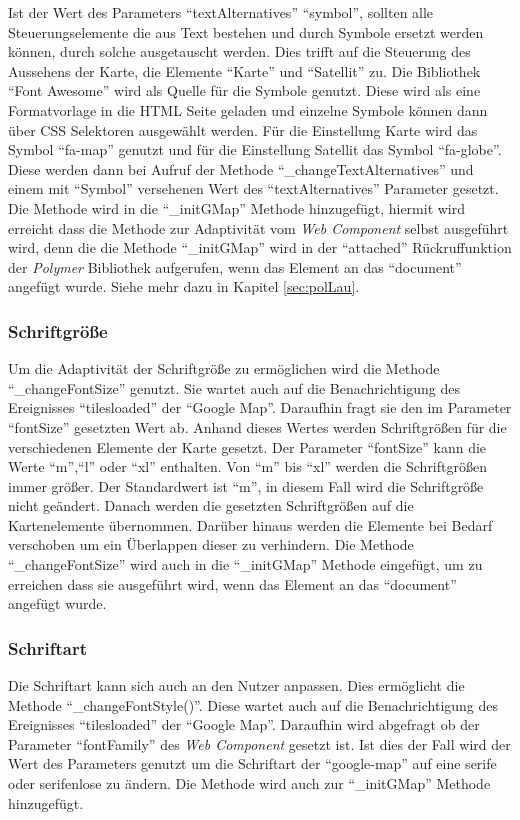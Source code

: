 \documentclass[12pt, paper=a4, bibtotoc, toc=listof, headsepline=true]{scrreprt}
\begin{document}
		\newline
		Ist der Wert des Parameters \enquote{textAlternatives} \enquote{symbol}, sollten alle Steuerungselemente die aus Text bestehen und durch Symbole ersetzt werden können, durch solche ausgetauscht werden. Dies trifft auf die Steuerung des Aussehens der Karte, die Elemente \enquote{Karte} und \enquote{Satellit} zu. Die Bibliothek \enquote{Font Awesome} wird als Quelle für die Symbole genutzt. Diese wird als eine Formatvorlage in die \ac{HTML} Seite geladen und einzelne Symbole können dann über \ac{CSS} Selektoren ausgewählt werden. Für die Einstellung Karte wird das Symbol \enquote{fa-map} genutzt und für die Einstellung Satellit das Symbol \enquote{fa-globe}. Diese werden dann bei Aufruf der Methode \enquote{\_changeTextAlternatives} und einem mit \enquote{Symbol} versehenen Wert des \enquote{textAlternatives} Parameter gesetzt. Die Methode wird in die \enquote{\_initGMap} Methode hinzugefügt, hiermit wird erreicht dass die Methode zur Adaptivität vom \emph{Web Component} selbst ausgeführt wird, denn die die Methode \enquote{\_initGMap} wird in der \enquote{attached} Rückruffunktion der \emph{Polymer} Bibliothek aufgerufen, wenn das Element an das \enquote{document} angefügt wurde. Siehe mehr dazu in Kapitel \ref{sec:polLau}.
		\subsubsection{Schriftgröße}
		\label{sec:fontsize}
		Um die Adaptivität der Schriftgröße zu ermöglichen wird die Methode \enquote{\_changeFontSize} genutzt.  Sie wartet auch auf die Benachrichtigung des Ereignisses \enquote{tilesloaded} der \enquote{Google Map}. Daraufhin fragt sie den im Parameter \enquote{fontSize} gesetzten Wert ab. Anhand dieses Wertes werden Schriftgrößen für die verschiedenen Elemente der Karte gesetzt. Der Parameter \enquote{fontSize} kann die Werte \enquote{m},\enquote{l} oder \enquote{xl} enthalten. Von \enquote{m} bis \enquote{xl} werden die Schriftgrößen immer größer. Der Standardwert ist \enquote{m}, in diesem Fall wird die Schriftgröße nicht geändert. Danach werden die gesetzten Schriftgrößen auf die Kartenelemente übernommen. Darüber hinaus werden die Elemente bei Bedarf verschoben um ein Überlappen dieser zu verhindern. Die Methode \enquote{\_changeFontSize} wird auch in die \enquote{\_initGMap} Methode eingefügt, um zu erreichen dass sie ausgeführt wird, wenn das Element an das \enquote{document} angefügt wurde.
		\subsubsection{Schriftart}
		Die Schriftart kann sich auch an den Nutzer anpassen. Dies ermöglicht die Methode \enquote{\_changeFontStyle()}. Diese wartet auch auf die Benachrichtigung des Ereignisses \enquote{tilesloaded} der \enquote{Google Map}. Daraufhin wird abgefragt ob der Parameter \enquote{fontFamily} des \emph{Web Component} gesetzt ist. Ist dies der Fall wird der Wert des Parameters genutzt um die Schriftart der \enquote{google-map} auf eine serife oder serifenlose zu ändern. Die Methode wird auch zur \enquote{\_initGMap} Methode hinzugefügt.
\end{document}
